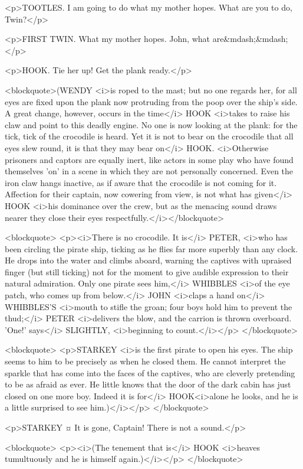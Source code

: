 <p>TOOTLES. I am going to do what my mother hopes. What are you to do, Twin?</p>

<p>FIRST TWIN. What my mother hopes. John, what are&mdash;&mdash;</p>

<p>HOOK. Tie her up! Get the plank ready.</p>

<blockquote>(WENDY <i>is roped to the mast; but no one regards her, for all eyes are fixed upon the plank now protruding from the poop over the ship's side. A great change, however, occurs in the time</i> HOOK <i>takes to raise his claw and point to this deadly engine. No one is now looking at the plank: for the tick, tick of the crocodile is heard. Yet it is not to bear on the crocodile that all eyes slew round, it is that they may bear on</i> HOOK. <i>Otherwise prisoners and captors are equally inert, like actors in some play who have found themselves 'on' in a scene in which they are not personally concerned. Even the iron claw hangs inactive, as if aware that the crocodile is not coming for it. Affection for their captain, now cowering from view, is not what has given</i> HOOK <i>his dominance over the crew, but as the menacing sound draws nearer they close their eyes respectfully.</i></blockquote>

<blockquote> <p><i>There is no crocodile. It is</i> PETER, <i>who has been circling the pirate ship, ticking as he flies far more superbly than any clock. He drops into the water and climbs aboard, warning the captives with upraised finger (but still ticking) not for the moment to give audible expression to their natural admiration. Only one pirate sees him,</i> WHIBBLES <i>of the eye patch, who comes up from below.</i> JOHN <i>claps a hand on</i> WHIBBLES'S <i>mouth to stifle the groan; four boys hold him to prevent the thud;</i> PETER <i>delivers the blow, and the carrion is thrown overboard. 'One!' says</i> SLIGHTLY, <i>beginning to count.</i></p> </blockquote>

<blockquote> <p>STARKEY <i>is the first pirate to open his eyes. The ship seems to him to be precisely as when he closed them. He cannot interpret the sparkle that has come into the faces of the captives, who are cleverly pretending to be as afraid as ever. He little knows that the door of the dark cabin has just closed on one more boy. Indeed it is for</i> HOOK<i>alone he looks, and he is a little surprised to see him.)</i></p> </blockquote>

<p>STARKEY ¤
It is gone, Captain! There is not a sound.</p>

<blockquote> <p><i>(The tenement that is</i> HOOK <i>heaves tumultuously and he is himself again.)</i></p> </blockquote>

